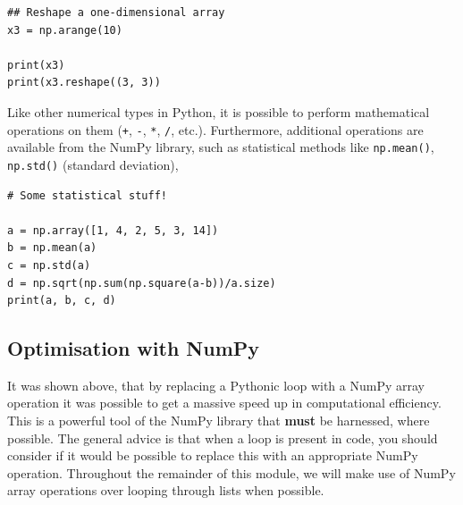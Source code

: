 \documentclass[a4paper]{article}
\begin{document}
\begin{lstlisting}
## Reshape a one-dimensional array
x3 = np.arange(10)

print(x3)
print(x3.reshape((3, 3))
\end{lstlisting}

Like other numerical types in Python, it is possible to perform mathematical operations on them (\texttt{+}, \texttt{-}, \texttt{*}, \texttt{/}, etc.).
Furthermore, additional operations are available from the NumPy library, such as statistical methods like \texttt{np.mean()}, \texttt{np.std()} (standard deviation),
\begin{lstlisting}
# Some statistical stuff!

a = np.array([1, 4, 2, 5, 3, 14])
b = np.mean(a)
c = np.std(a)
d = np.sqrt(np.sum(np.square(a-b))/a.size)
print(a, b, c, d)
\end{lstlisting}

\subsection{Optimisation with NumPy}

It was shown above, that by replacing a Pythonic loop with a NumPy array operation it was possible to get a massive speed up in computational efficiency.
This is a powerful tool of the NumPy library that \textbf{must} be harnessed, where possible.
The general advice is that when a loop is present in code, you should consider if it would be possible to replace this with an appropriate NumPy operation.
Throughout the remainder of this module, we will make use of NumPy array operations over looping through lists when possible.
\vspace{\baselineskip}
\begin{center}
	\noindent{}
\end{center}
\end{document}
